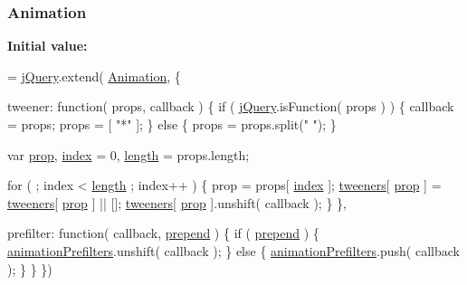 \subsubsection[{Animation}]{ Animation}\label{_bibabook_2_scripts_2jquery-1_810_82_8js_a3299b781c8ec8287357326920ab3565a}
{\bfseries Initial value\+:}
\begin{DoxyCode}
= \hyperlink{_bibabook_2_scripts_2jquery-1_810_82_8js_a5e01048fbd3a30b44e8d491d8945c457}{jQuery}.extend( \hyperlink{_bibabook_2_scripts_2jquery-1_810_82_8js_a3299b781c8ec8287357326920ab3565a}{Animation}, \{

    tweener: \textcolor{keyword}{function}( props, callback ) \{
        \textcolor{keywordflow}{if} ( \hyperlink{_bibabook_2_scripts_2jquery-1_810_82_8js_a5e01048fbd3a30b44e8d491d8945c457}{jQuery}.isFunction( props ) ) \{
            callback = props;
            props = [ \textcolor{stringliteral}{"*"} ];
        \} \textcolor{keywordflow}{else} \{
            props = props.split(\textcolor{stringliteral}{" "});
        \}

        var \hyperlink{jquery-1_810_82-vsdoc_8js_af17be84954030af6c2286f5da385d41b}{prop},
            \hyperlink{jquery-1_810_82-vsdoc_8js_a75bb12d1f23302a9eea93a6d89d0193e}{index} = 0,
            \hyperlink{jquery-1_810_82-vsdoc_8js_aa7de35d58da66d9944ab9cbe82c19640}{length} = props.length;

        \textcolor{keywordflow}{for} ( ; index < \hyperlink{jquery-1_810_82-vsdoc_8js_aa7de35d58da66d9944ab9cbe82c19640}{length} ; index++ ) \{
            prop = props[ \hyperlink{jquery-1_810_82-vsdoc_8js_a75bb12d1f23302a9eea93a6d89d0193e}{index} ];
            \hyperlink{_bibabook_2_scripts_2jquery-1_810_82_8js_a948afd2431eec272c99689edddfb6850}{tweeners}[ \hyperlink{jquery-1_810_82-vsdoc_8js_af17be84954030af6c2286f5da385d41b}{prop} ] = \hyperlink{_bibabook_2_scripts_2jquery-1_810_82_8js_a948afd2431eec272c99689edddfb6850}{tweeners}[ \hyperlink{jquery-1_810_82-vsdoc_8js_af17be84954030af6c2286f5da385d41b}{prop} ] || [];
            \hyperlink{_bibabook_2_scripts_2jquery-1_810_82_8js_a948afd2431eec272c99689edddfb6850}{tweeners}[ \hyperlink{jquery-1_810_82-vsdoc_8js_af17be84954030af6c2286f5da385d41b}{prop} ].unshift( callback );
        \}
    \},

    prefilter: \textcolor{keyword}{function}( callback, \hyperlink{jquery-1_810_82-vsdoc_8js_a2d1a98145e139b1aea1d95967466b151}{prepend} ) \{
        \textcolor{keywordflow}{if} ( \hyperlink{jquery-1_810_82-vsdoc_8js_a2d1a98145e139b1aea1d95967466b151}{prepend} ) \{
            \hyperlink{_bibabook_2_scripts_2jquery-1_810_82_8js_adb3f17c5359fbc12b7043b6969553d78}{animationPrefilters}.unshift( callback );
        \} \textcolor{keywordflow}{else} \{
            \hyperlink{_bibabook_2_scripts_2jquery-1_810_82_8js_adb3f17c5359fbc12b7043b6969553d78}{animationPrefilters}.push( callback );
        \}
    \}
\})
\end{DoxyCode}
